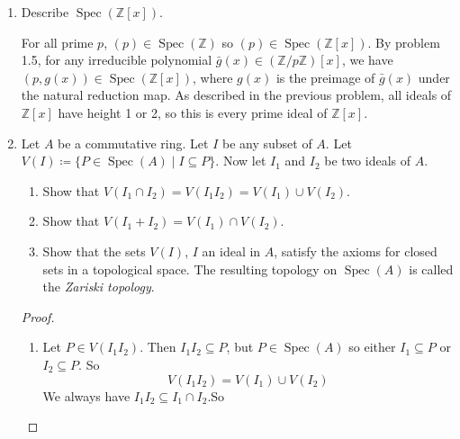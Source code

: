 \documentclass[hidelinks,12pt]{article}
\newcommand{\Z}{\mathbb{Z}}
\newcommand{\Q}{\mathbb{Q}}
\renewcommand{\sp}{\operatorname{Spec}}
\begin{document}
\begin{enumerate}
\begin{proof}
\begin{itemize}
\[        p\in(px-1)\implies p=a(px-1)
        \]
        But LHS is degree 0 and RHS has degree at least 1. So \((p)\not\subset(px-1)\), then the chain \((0)\subset(px-1)\) gives \(\operatorname{ht}((px-1))=1\).
    \item Consider the quotient ring \[
            A[x]/(p,x)\cong (A[x]/(p))/(x)\cong A/(p)[x]/(x)\cong\Q
    \]
    Because \(A/(p)\cong\Q\) as \(A\) is a local Noetherian domain with maximal ideal \((p)\), and \(Q[x]/(x)\cong\Q\). So \((p,x)\) is maximal in \(A[x]\). It has a chain \[
        (0)\subset(p)\subset(p,x)
    \]
    Because \((p)\subset(p,x)\) by definition, so \((p,x)\) has height 2.
    \end{itemize}
    \end{proof}
\item Describe \(\sp(\Z[x])\). \par\null\par For all prime \(p\), \((p)\in\sp(\Z)\) so \((p)\in\sp(\Z[x])\). By problem 1.5, for any irreducible polynomial \(\bar{g}(x)\in(\Z/p\Z)[x]\), we have \((p,g(x))\in\sp(\Z[x])\), where \(g(x)\) is the preimage of \(\bar{g}(x)\) under the natural reduction map. As described in the previous problem, all ideals of \(\Z[x]\) have height 1 or 2, so this is every prime ideal of \(\Z[x]\).
\item Let \(A\) be a commutative ring. Let \(I\) be any subset of \(A\). Let \(V(I)\coloneqq\{P\in\sp(A)\mid I\subseteq P\}\). Now let \(I_{1}\) and \(I_{2}\) be two ideals of \(A\).
    \begin{enumerate}[label=(\alph*).]
        \item Show that \(V(I_{1}\cap I_{2})=V(I_{1}I_{2})=V(I_{1})\cup V(I_{2})\).
        \item Show that \(V(I_{1}+I_{2})=V(I_{1})\cap V(I_{2})\).
        \item Show that the sets \(V(I)\), \(I\) an ideal in \(A\), satisfy the axioms for closed sets in a topological space. The resulting topology on \(\sp(A)\) is called the \emph{Zariski topology}.
    \end{enumerate}
    \begin{proof}
    \begin{enumerate}[label=(\alph*).]
        \item Let \(P\in V(I_{1}I_{2})\). Then \(I_{1}I_{2}\subseteq P\), but \(P\in\sp(A)\) so either \(I_{1}\subseteq P\) or \(I_{2}\subseteq P\). So
            \[
                V(I_{1}I_{2})=V(I_{1})\cup V(I_{2})
            \]
            We always have \(I_{1}I_{2}\subseteq I_{1}\cap I_{2}\).So

\end{enumerate}
\end{proof}
\end{enumerate}
\end{document}
